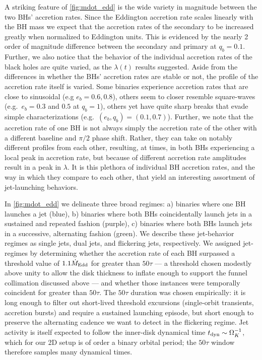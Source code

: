 \documentclass[fleqn,usenatbib]{mnras}
\begin{document}
A striking feature of \autoref{fig:mdot_edd} is the wide variety in magnitude between the two BHs' accretion rates. Since the Eddington accretion rate scales linearly with the BH mass we expect that the accretion rates of the secondary to be increased greatly when normalized to Eddington units. This is evidenced by the nearly 2 order of magnitude difference between the secondary and primary at $q_b=0.1$. Further, we also notice that the behavior of the individual accretion rates of the black holes are quite varied, as the $\lambda(t)$ results suggested. Aside from the differences in whether the BHs' accretion rates are stable or not, the profile of the accretion rate itself is varied. Some binaries experience accretion rates that are close to sinusoidal (e.g $e_b=0.6, 0.8$), others seem to closer resemble square-waves (e.g.\ $e_b=0.3$ and $0.5$ at $q_b=1$), others yet have quite sharp breaks that evade simple characterizations (e.g.\ $(e_b, q_b) = (0.1, 0.7)$). Further, we note that the accretion rate of one BH is not always simply the accretion rate of the other with a different baseline and $\pi/2$ phase shift. Rather, they can take on notably different profiles from each other, resulting, at times, in both BHs experiencing a local peak in accretion rate, but because of different accretion rate amplitudes result in a peak in $\lambda$. It is this plethora of individual BH accretion rates, and the way in which they compare to each other, that yield an interesting assortment of jet-launching behaviors.

In \autoref{fig:mdot_edd} we delineate three broad regimes: a) binaries where one BH launches a jet (blue), b) binaries where both BHs coincidentally launch jets in a sustained and repeated fashion (purple), c) binaries where both BHs launch jets in a successive, alternating fashion (green). We describe these jet-behavior regimes as single jets, dual jets, and flickering jets, respectively. We assigned jet-regimes by determining whether the accretion rate of each BH surpassed a threshold value of $1.1 \dot{M}_{\rm Edd}$ for greater than $50\tau$ --- a threshold chosen modestly above unity to allow the disk thickness to inflate enough to support the funnel collimation discussed above --- and whether those instances were temporally coincident for greater than $50\tau$. The $50\tau$ duration was chosen empirically: it is long enough to filter out short-lived threshold excursions (single-orbit transients, accretion bursts) and require a sustained launching episode, but short enough to preserve the alternating cadence we want to detect in the flickering regime. Jet activity is itself expected to follow the inner-disk dynamical time $t_{\rm dyn} \sim \Omega_K^{-1}$, which for our 2D setup is of order a binary orbital period; the $50\tau$ window therefore samples many dynamical times.
\end{document}
